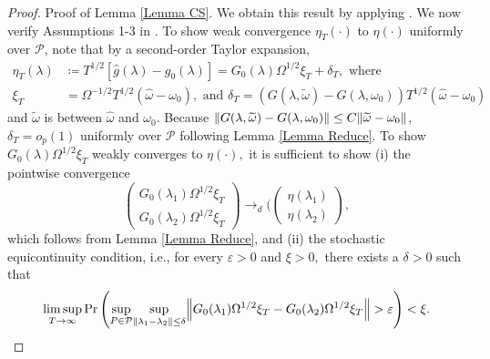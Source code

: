 \documentclass[11pt, letterpaper, twoside]{article}
\begin{document}
\begin{appendices}
\begin{proof}

\noindent Proof of Lemma \ref{Lemma CS}. 
We obtain this result by applying \textcite[Theorem 1]{andrews2016conditional}. 
We now verify Assumptions 1-3 in \textcite{andrews2016conditional}. 
To show weak convergence $\eta _{T}(\cdot )$ to $\eta (\cdot )$ uniformly over $\mathcal{P}$, note that by a second-order Taylor expansion,
%
\begin{align}
    \eta _{T}(\lambda) 
%
    &\coloneqq T^{1/2}\left[ \widehat{g}(\lambda )-g_{0}(\lambda ) \right] = G_{0}(\lambda )\Omega ^{1/2}\xi _{T}+\delta _{T},\text{ where} \nonumber \\
%
    \xi _{T} 
    &= \Omega ^{-1/2}T^{1/2}\left( \widehat{\omega }-\omega _{0}\right), \text{ and } 
%
    \delta _{T} =\left( G(\lambda ,  \widetilde{\omega })-G(\lambda, \omega _{0})\right) T^{1/2}(\widehat{\omega }-\omega _{0})
%
\end{align}%
%
and $\widetilde{\omega }$ is between $\widehat{\omega }$ and $\omega_{0}$.
%
Because $\lVert G(\lambda ,\widetilde{\omega })-G(\lambda ,\omega _{0})\rVert \leq C \lVert\widetilde{\omega }-\omega_{0}\rVert$, $\delta _{T}=o_{p}(1)$ uniformly over $ \mathcal{P}$ following Lemma \ref{Lemma Reduce}. 
To show $G_{0}(\lambda)\Omega ^{1/2}\xi _{T}$ weakly converges to $\eta (\cdot ),$ it is sufficient to show (i) the pointwise convergence%
%
\begin{equation}
% 
    \begin{pmatrix}
        G_{0}(\lambda _{1})\Omega ^{1/2}\xi _{T} \\ 
        G_{0}(\lambda _{2})\Omega ^{1/2}\xi _{T}%
    \end{pmatrix}%
%
    \rightarrow _{d}( 
%
    \begin{pmatrix}
        \eta (\lambda _{1}) \\ 
        \eta (\lambda _{2})%
    \end{pmatrix},
%
\end{equation}%
%
which follows from Lemma \ref{Lemma Reduce}, and (ii) the stochastic equicontinuity condition, i.e., for every $\varepsilon >0$ and $\xi >0,$ there exists a $\delta >0$ such that
%
\begin{equation}
    \underset{T\rightarrow \infty }{\lim\sup }\Pr \left( \underset{P\in \mathcal{P}}{\sup }\underset{\norm{\lambda _{1}-\lambda _{2}}\leq \delta }{\sup }\norm*{G_{0}(\lambda _{1})\Omega ^{1/2}\xi _{T}-G_{0}(\lambda
    _{2})\Omega ^{1/2}\xi _{T}} >\varepsilon \right) < \xi.
\end{equation}%

\end{proof}
\end{appendices}
\end{document}

